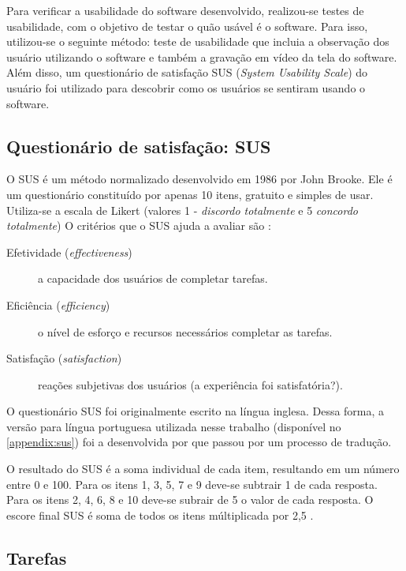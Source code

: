 Para verificar a usabilidade do software desenvolvido, realizou-se testes de usabilidade, com o
objetivo de testar o quão usável é o software. Para isso, utilizou-se o seguinte método: teste de usabilidade
que incluia a observação dos usuário utilizando o software e também a gravação em vídeo da tela do
software. Além disso, um questionário de satisfação SUS (\textit{System Usability Scale}) do usuário foi utilizado para descobrir como
os usuários se sentiram usando o software.

\subsection{Questionário de satisfação: SUS}\label{sub:sus}

O SUS é um método normalizado desenvolvido em 1986 por John Brooke.
Ele é um questionário constituído por apenas 10 itens, gratuito e simples de usar.
Utiliza-se a escala de Likert (valores 1 - \textit{discordo totalmente} e 5 \textit{concordo totalmente})
O critérios que o SUS ajuda a avaliar são \cite{brooke1996sus}:

\begin{description}
  \item[Efetividade (\textit{effectiveness})] a capacidade dos usuários de completar tarefas.
  \item[Eficiência (\textit{efficiency})] o nível de esforço e recursos necessários completar as tarefas.
  \item[Satisfação (\textit{satisfaction})] reações subjetivas dos usuários (a experiência foi satisfatória?).
\end{description}

O questionário SUS foi originalmente escrito na língua inglesa. Dessa forma, a versão para língua portuguesa
utilizada nesse trabalho (disponível no \autoref{appendix:sus}) foi a desenvolvida por  que passou por um processo
de tradução.

O resultado do SUS é a soma individual de cada item, resultando em um número entre 0 e 100.
Para os itens 1, 3, 5, 7 e 9 deve-se subtrair 1 de cada resposta. Para os itens 2, 4, 6, 8 e 10 deve-se
subrair de 5 o valor de cada resposta. O escore final SUS é soma de todos os itens múltiplicada por 2,5 \cite{brooke1996sus}.

\subsection{Tarefas}

